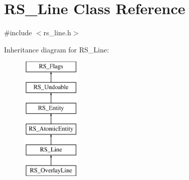\hypertarget{classRS__Line}{\section{R\-S\-\_\-\-Line Class Reference}
\label{classRS__Line}
}


{\ttfamily \#include $<$rs\-\_\-line.\-h$>$}

Inheritance diagram for R\-S\-\_\-\-Line\-:\begin{figure}[H]
\begin{center}
\leavevmode
\includegraphics[height=6.000000cm]{classRS__Line}
\end{center}
\end{figure}
